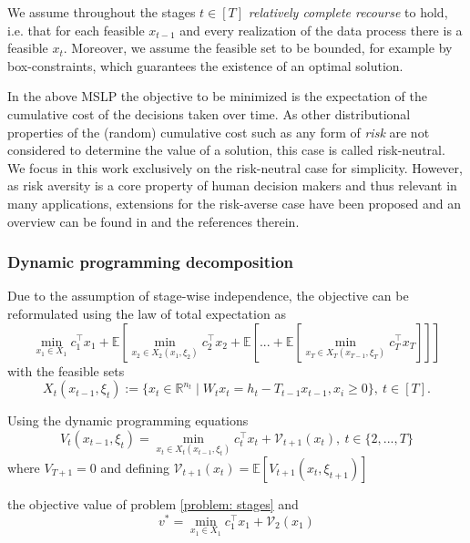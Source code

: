\documentclass[a4paper,12pt]{article}
\newcommand{\R}{\mathbb R} %
\newcommand{\E}{\mathbb{E}}
\begin{document}
We assume throughout the stages $t\in [T]$ \emph{relatively complete recourse} \cite{birge2011introduction} to hold, i.e. that for each feasible $x_{t-1}$ and every realization of the data process there is a feasible $x_t$. Moreover, we assume the feasible set to be bounded, for example by box-constraints, which guarantees the existence of an optimal solution.

In the above MSLP the objective to be minimized is the expectation of the cumulative cost of the decisions taken over time. As other distributional properties of the (random) cumulative cost such as any form of \emph{risk} are not considered to determine the value of a solution, this case is called risk-neutral. We focus in this work exclusively on the risk-neutral case for simplicity. However, as risk aversity is a core property of human decision makers and thus relevant in many applications, extensions for the risk-averse case have been proposed and an overview can be found in \cite{shapiro2021tutorial} and the references therein.

\subsubsection{Dynamic programming decomposition}
Due to the assumption of stage-wise independence, the objective can be reformulated using the law of total expectation as
\begin{equation}
    \min_{x_1 \in X_1} c_1^\top x_1 + \E \left[ \min_{x_2 \in X_2(x_1, \xi_2)} c_2^\top x_2 + \E\left[ ... + \E\left[ \min_{x_T \in X_T(x_{T-1}, \xi_T)} c_T^\top x_T \right]\right] \right]
    \label{problem: stages}
\end{equation}
with the feasible sets \[X_t(x_{t-1}, \xi_t) := \{x_t \in \R^{n_t} \mid W_t x_t = h_t - T_{t-1} x_{t-1}, x_i \geq 0\}, \ t\in [T].\]

Using the dynamic programming equations
\begin{equation}
    V_t(x_{t-1}, \xi_t) = \min_{x_t \in  X_t(x_{t-1}, \xi_t)} c_t^\top x_t + \mathcal{V}_{t+1}(x_t),\ t \in \{2, ..., T\}
    \label{problem: dpe}
\end{equation}
where $V_{T+1} = 0$ and defining $\mathcal{V}_{t+1}(x_t) = \E[V_{t+1}(x_t, \xi_{t+1})]$

the objective value of problem \eqref{problem: stages} and 
\begin{equation}
    v^* = \min_{x_1 \in X_1} c_1^\top x_1 + \mathcal{V}_{2}(x_1)
    \label{problem: first stage}
\end{equation}
\end{document}
